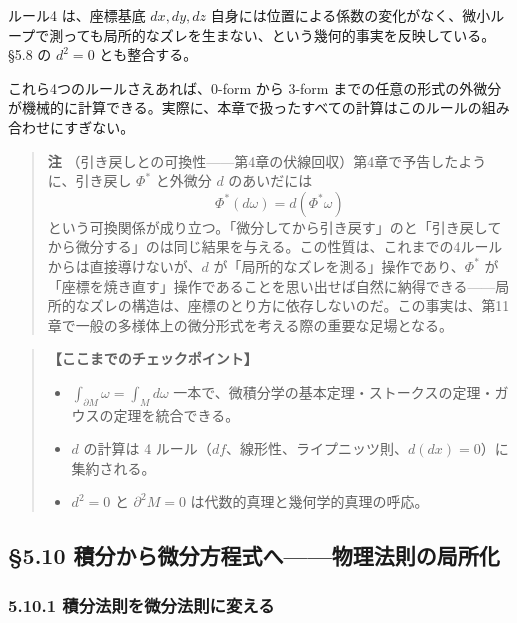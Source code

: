 \documentclass[a4paper,12pt,openany]{book}
\begin{document}
ルール4 は、座標基底 \(dx,dy,dz\)
自身には位置による係数の変化がなく、微小ループで測っても局所的なズレを生まない、という幾何的事実を反映している。§5.8
の \(d^2=0\) とも整合する。

これら4つのルールさえあれば、\(0\)-form から \(3\)-form
までの任意の形式の外微分が機械的に計算できる。実際に、本章で扱ったすべての計算はこのルールの組み合わせにすぎない。

\begin{quote}
\textbf{注}
（引き戻しとの可換性——第4章の伏線回収）第4章で予告したように、引き戻し
\(\Phi^*\) と外微分 \(d\) のあいだには
\[\Phi^*(d\omega) = d(\Phi^*\omega)\]
という可換関係が成り立つ。「微分してから引き戻す」のと「引き戻してから微分する」のは同じ結果を与える。この性質は、これまでの4ルールからは直接導けないが、\(d\)
が「局所的なズレを測る」操作であり、\(\Phi^*\)
が「座標を焼き直す」操作であることを思い出せば自然に納得できる——局所的なズレの構造は、座標のとり方に依存しないのだ。この事実は、第11章で一般の多様体上の微分形式を考える際の重要な足場となる。
\end{quote}

\begin{quote}
\textbf{【ここまでのチェックポイント】}

\begin{itemize}
\item
  \(\int_{\partial M} \omega = \int_M d\omega\)
  一本で、微積分学の基本定理・ストークスの定理・ガウスの定理を統合できる。
\item
  \(d\) の計算は 4
  ルール（\(df\)、線形性、ライプニッツ則、\(d(dx)=0\)）に集約される。
\item
  \(d^2=0\) と \(\partial^2 M=0\) は代数的真理と幾何学的真理の呼応。
\end{itemize}
\end{quote}

\par\vspace{0.35em}\par

\hypertarget{ux7a4dux5206ux304bux3089ux5faeux5206ux65b9ux7a0bux5f0fux3078ux7269ux7406ux6cd5ux5247ux306eux5c40ux6240ux5316}{%
\subsection{§5.10
積分から微分方程式へ——物理法則の局所化}\label{ux7a4dux5206ux304bux3089ux5faeux5206ux65b9ux7a0bux5f0fux3078ux7269ux7406ux6cd5ux5247ux306eux5c40ux6240ux5316}}

\hypertarget{ux7a4dux5206ux6cd5ux5247ux3092ux5faeux5206ux6cd5ux5247ux306bux5909ux3048ux308b}{%
\subsubsection{5.10.1
積分法則を微分法則に変える}\label{ux7a4dux5206ux6cd5ux5247ux3092ux5faeux5206ux6cd5ux5247ux306bux5909ux3048ux308b}}
\end{document}
